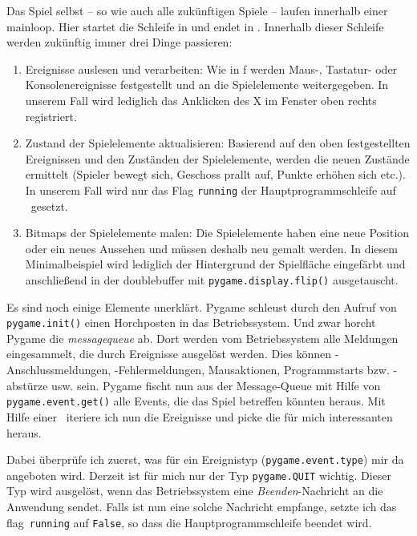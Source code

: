 Das Spiel selbst -- so wie auch alle zukünftigen Spiele -- laufen innerhalb einer \Gls{mainloop}. Hier startet die Schleife in  und endet in . Innerhalb dieser Schleife werden zukünftig immer drei Dinge passieren: 
\begin{enumerate}
	\item Ereignisse auslesen und verarbeiten: Wie in f werden Maus-, Tastatur- oder Konsolenereignisse festgestellt und an die Spielelemente weitergegeben. In unserem Fall wird lediglich das Anklicken des X im Fenster oben rechts registriert.  
	\item Zustand der Spielelemente aktualisieren: Basierend auf den oben festgestellten Ereignissen und den Zuständen der Spielelemente, werden die neuen Zustände ermittelt (Spieler bewegt sich, Geschoss prallt auf, Punkte erhöhen sich etc.). In unserem Fall wird nur das Flag \texttt{running} der Hauptprogrammschleife auf \false\ gesetzt.
	\item Bitmaps der Spielelemente malen: Die Spielelemente haben eine neue Position oder ein neues Aussehen und müssen deshalb neu gemalt werden. In diesem Minimalbeispiel wird lediglich  der Hintergrund der Spielfläche eingefärbt und anschließend in  der \Gls{doublebuffer} mit \texttt{pygame.display.flip()} ausgetauscht.
\end{enumerate}

Es sind noch einige Elemente unerklärt. Pygame schleust durch den Aufruf von \texttt{py\-game.\-init()} einen Horchposten in das Betriebssystem. Und zwar horcht Pygame die \emph{\Gls{messagequeue}} ab. Dort werden vom Betriebssystem alle Meldungen eingesammelt, die durch Ereignisse ausgelöst werden. Dies können -An\-schluss\-mel\-dungen, -Fehlermeldungen, Mausaktionen, Programmstarts bzw. -abstürze  usw. sein. Pygame fischt nun aus der Message-Queue mit Hilfe von \texttt{pygame.event.get()} alle Events, die das Spiel betreffen könnten heraus. Mit Hilfe einer \forSchleife\ iteriere ich nun die Ereignisse und picke die für mich interessanten heraus. 

Dabei überprüfe ich zuerst, was für ein Ereignistyp (\texttt{pygame.event.type}) mir da angeboten wird. Derzeit ist für mich nur der Typ \texttt{pygame.QUIT} wichtig. Dieser Typ wird ausgelöst, wenn das Betriebssystem eine \emph{Beenden}-Nachricht an die Anwendung sendet. Falls ist nun eine solche Nachricht empfange, setzte ich das \Gls{flag}\ \texttt{running} auf \texttt{False}, so dass die Hauptprogrammschleife beendet wird.

